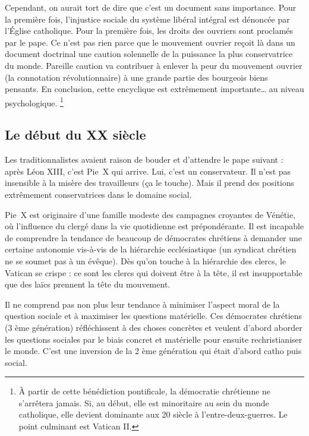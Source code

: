 \documentclass[12pt]{report}
\begin{document}
Cependant, on aurait tort de dire que c’est un document sans importance. 
Pour la première fois, l’injustice sociale du système libéral intégral est dénoncée par l’Église catholique. 
Pour la première fois, les droits des ouvriers sont proclamés par le pape. 
Ce n'est pas rien parce que le mouvement ouvrier reçoit là dans un document doctrinal une caution solennelle de la puissance la plus conservatrice du monde. 
Pareille caution va contribuer à enlever la peur du mouvement ouvrier (la connotation révolutionnaire) à une grande partie des bourgeois biens pensants. 
En conclusion, cette encyclique est extrêmement importante… au niveau psychologique.
\footnote{À partir de cette bénédiction pontificale, la démocratie chrétienne ne s'arrêtera jamais. Si, au début, elle est minoritaire au sein du monde catholique, elle devient dominante aux 20 siècle à l'entre-deux-guerres. Le point culminant est Vatican II.}


\subsection{Le début du XX siècle}

Les traditionnalistes avaient raison de bouder et d'attendre le pape suivant : après Léon XIII, c'est Pie~X qui arrive. Lui, c'est un conservateur. Il n'est pas insensible à la misère des travailleurs (ça le touche). Mais il prend des positions extrêmement conservatrices dans le domaine social.

Pie~X est originaire d'une famille modeste des campagnes croyantes de Vénétie, où l'influence du clergé dans la vie quotidienne est prépondérante.
Il est incapable de comprendre la tendance de beaucoup de démocrates chrétiens à demander une certaine autonomie vis-à-vis de la hiérarchie ecclésiastique (un syndicat chrétien ne se soumet pas à un évêque).
Dès qu'on touche à la hiérarchie des clercs, le Vatican se crispe : ce sont les clercs qui doivent être à la tête, il est insupportable que des laïcs prennent la tête du mouvement.

Il ne comprend pas non plus leur tendance à minimiser l'aspect moral de la question sociale et à maximiser les questions matérielle.
Ces démocrates chrétiens (3 ème génération) réfléchissent à des choses concrètes et veulent d’abord aborder les questions sociales par le biais concret et matérielle pour ensuite rechristianiser le monde.
C’est une inversion de la 2 ème génération qui était d’abord catho puis social.
\end{document}

